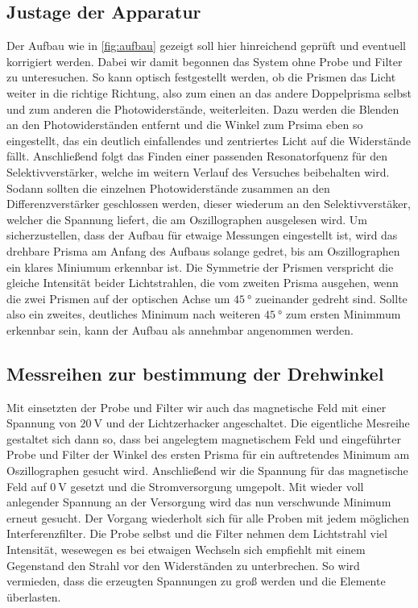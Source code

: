 \subsection{Justage der Apparatur}
Der Aufbau wie in \ref{fig:aufbau} gezeigt soll hier hinreichend geprüft und eventuell korrigiert werden.
Dabei wir damit begonnen das System ohne Probe und Filter zu unteresuchen. So kann optisch festgestellt werden, 
ob die Prismen das Licht weiter in die richtige Richtung, also zum einen an das andere Doppelprisma selbst und zum anderen die Photowiderstände, weiterleiten.
Dazu werden die Blenden an den Photowiderständen entfernt und die Winkel zum Prsima eben so eingestellt, das
ein deutlich einfallendes und zentriertes Licht auf die Widerstände fällt.
Anschließend folgt das Finden einer passenden Resonatorfquenz für den Selektivverstärker,
welche im weitern Verlauf des Versuches beibehalten wird. Sodann sollten die einzelnen Photowiderstände zusammen 
an den Differenzverstärker geschlossen werden, dieser wiederum an den Selektivverstäker,
welcher die Spannung liefert, die am Oszillographen ausgelesen wird. 
Um sicherzustellen, dass der Aufbau für etwaige Messungen eingestellt ist, wird das drehbare Prisma am Anfang des 
Aufbaus solange gedret, bis am Oszillographen ein klares Miniumum erkennbar ist. 
Die Symmetrie der Prismen verspricht die gleiche Intensität beider Lichtstrahlen, die vom zweiten 
Prisma ausgehen, wenn die zwei Prismen auf der optischen Achse um $\SI{45}{\degree}$
zueinander gedreht sind. Sollte also ein zweites, deutliches Minimum nach weiteren $\SI{45}{\degree}$ zum ersten Minimmum erkennbar sein, %
kann der Aufbau als annehmbar angenommen werden.

\subsection{Messreihen zur bestimmung der Drehwinkel}
Mit einsetzten der Probe und Filter wir auch das magnetische Feld mit einer Spannung von
$\SI{20}{\volt}$ und der Lichtzerhacker angeschaltet. Die eigentliche Mesreihe gestaltet sich dann so,
dass bei angelegtem magnetischem Feld und eingeführter Probe und Filter der Winkel des ersten Prisma
für ein auftretendes Minimum am Oszillographen gesucht wird. 
Anschließend wir die Spannung für das magnetische Feld auf $\SI{0}{\volt}$ gesetzt
und die Stromversorgung umgepolt. Mit wieder voll anlegender Spannung an der Versorgung wird das nun verschwunde Minimum erneut gesucht.
Der Vorgang wiederholt sich für alle Proben mit jedem möglichen Interferenzfilter.
Die Probe selbst und die Filter nehmen dem Lichtstrahl viel Intensität, wesewegen es bei etwaigen 
Wechseln sich empfiehlt mit einem Gegenstand den Strahl vor den Widerständen zu unterbrechen.
So wird vermieden, dass die erzeugten Spannungen zu groß werden und die Elemente überlasten.

